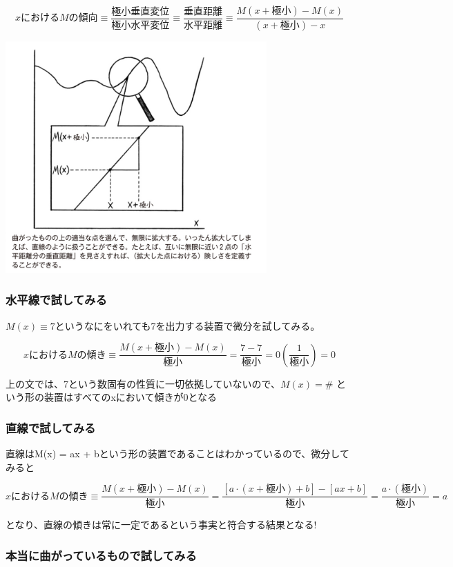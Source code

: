 \documentclass[dvipdfmx]{jsarticle}
\begin{document}
\[ xにおけるMの傾向 \equiv \frac{極小垂直変位}{極小水平変位} \equiv \frac{垂直距離}{水平距離} \equiv \frac{M(x+極小) - M(x)}{(x + 極小) -x } \]

  \includegraphics[width=10cm]{images/burn_math_2-1.png}

\subsubsection{水平線で試してみる}

$M(x) \equiv 7$というなにをいれても7を出力する装置で微分を試してみる。

\[ xにおけるMの傾き \equiv \frac{M(x + 極小) - M(x)}{極小} = \frac{7-7}{極小} = 0(\frac{1}{極小}) = 0 \]

上の文では、7という数固有の性質に一切依拠していないので、$M(x) = \#$ という形の装置はすべてのxにおいて傾きが0となる


\subsubsection{直線で試してみる}

直線はM(x) = ax + bという形の装置であることはわかっているので、微分してみると

\[ xにおけるMの傾き \equiv \frac{M(x + 極小) - M(x)}{極小} = \frac{[a \cdot (x + 極小) + b] - [ax + b]}{極小} = \frac{a \cdot (極小)}{極小} = a \]

となり、直線の傾きは常に一定であるという事実と符合する結果となる!

\subsubsection{本当に曲がっているもので試してみる}
\end{document}
